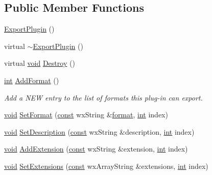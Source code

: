 \subsection*{Public Member Functions}
\begin{DoxyCompactItemize}
\item 
\hyperlink{class_export_plugin_a0488fb3f02f5ce79a0731bac216ddde4}{Export\+Plugin} ()
\item 
virtual \hyperlink{class_export_plugin_a5d65c93f595ee28b6afe6a7a83584e3d}{$\sim$\+Export\+Plugin} ()
\item 
virtual \hyperlink{sound_8c_ae35f5844602719cf66324f4de2a658b3}{void} \hyperlink{class_export_plugin_a31fc69bc8bf2a6f997e84ee806b80e45}{Destroy} ()
\item 
\hyperlink{xmltok_8h_a5a0d4a5641ce434f1d23533f2b2e6653}{int} \hyperlink{class_export_plugin_a95df7db8cf9e98fbe6161d13e3ec092d}{Add\+Format} ()
\begin{DoxyCompactList}\small\item\em Add a N\+EW entry to the list of formats this plug-\/in can export. \end{DoxyCompactList}\item 
\hyperlink{sound_8c_ae35f5844602719cf66324f4de2a658b3}{void} \hyperlink{class_export_plugin_ab7756c0fdad9e32f23e4b3319e2a3b8a}{Set\+Format} (\hyperlink{getopt1_8c_a2c212835823e3c54a8ab6d95c652660e}{const} wx\+String \&\hyperlink{_export_p_c_m_8cpp_a317afff57d87a89158c2b038d37b2b08}{format}, \hyperlink{xmltok_8h_a5a0d4a5641ce434f1d23533f2b2e6653}{int} index)
\item 
\hyperlink{sound_8c_ae35f5844602719cf66324f4de2a658b3}{void} \hyperlink{class_export_plugin_a1f3da5fd130ac36b6792530e64cb963e}{Set\+Description} (\hyperlink{getopt1_8c_a2c212835823e3c54a8ab6d95c652660e}{const} wx\+String \&description, \hyperlink{xmltok_8h_a5a0d4a5641ce434f1d23533f2b2e6653}{int} index)
\item 
\hyperlink{sound_8c_ae35f5844602719cf66324f4de2a658b3}{void} \hyperlink{class_export_plugin_aa443f439a64f0d13d7b9fe70a2bc59e0}{Add\+Extension} (\hyperlink{getopt1_8c_a2c212835823e3c54a8ab6d95c652660e}{const} wx\+String \&extension, \hyperlink{xmltok_8h_a5a0d4a5641ce434f1d23533f2b2e6653}{int} index)
\item 
\hyperlink{sound_8c_ae35f5844602719cf66324f4de2a658b3}{void} \hyperlink{class_export_plugin_a5783d24a1968197aa81d4196770f8e21}{Set\+Extensions} (\hyperlink{getopt1_8c_a2c212835823e3c54a8ab6d95c652660e}{const} wx\+Array\+String \&extensions, \hyperlink{xmltok_8h_a5a0d4a5641ce434f1d23533f2b2e6653}{int} index)

\end{DoxyCompactItemize}
